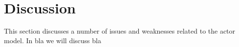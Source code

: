 





\section{Discussion}\label{sec:actor_discussion}
This section discusses a number of issues and weaknesses related to the actor model. In bla we will discuss bla 

	


